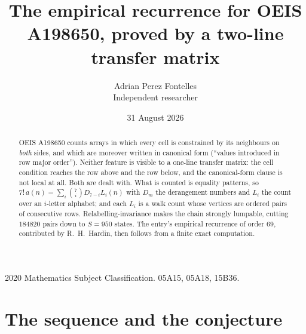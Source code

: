 \documentclass[11pt,a4paper]{article}
\title{The empirical recurrence for OEIS A198650, proved by a two-line transfer matrix}
\author{Adrian Perez Fontelles\\ \small Independent researcher}
\date{31 August 2026}
\theoremstyle{plain}
\theoremstyle{definition}
\begin{document}
\maketitle

\begin{abstract}
OEIS A198650 counts arrays in which every cell is constrained by its neighbours on \emph{both}
sides, and which are moreover written in canonical form (``values introduced in row major
order''). Neither feature is visible to a one-line transfer matrix: the cell condition
reaches the row above and the row below, and the canonical-form clause is not local at
all. Both are dealt with. What is counted is equality patterns, so
$7!\,a(n)=\sum_i\binom{7}{i}D_{7-i}L_i(n)$ with $D_m$ the derangement numbers and
$L_i$ the count over an $i$-letter alphabet; and each $L_i$ is a walk count whose vertices
are ordered pairs of consecutive rows. Relabelling-invariance makes the chain strongly
lumpable, cutting $184820$ pairs down to $S=950$ states. The entry's empirical recurrence of
order $69$, contributed by R.~H.~Hardin, then follows from a finite exact computation.
\end{abstract}

\noindent\small 2020 Mathematics Subject Classification. 05A15, 05A18, 15B36.\normalsize

\section{The sequence and the conjecture}
\end{document}
